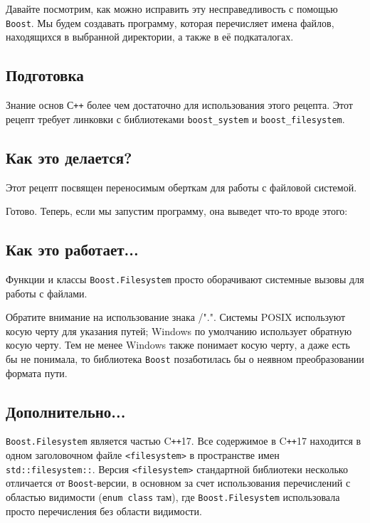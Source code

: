 \documentclass[a4paper, 12pt]{article} %
\begin{document}
Давайте посмотрим, как можно исправить эту несправедливость с помощью \texttt{Boost}. Мы будем создавать программу, которая перечисляет имена файлов, находящихся в выбранной директории, а также в её подкаталогах.

\subsection*{Подготовка}
Знание основ С\texttt{++} более чем достаточно для использования этого рецепта. Этот рецепт требует линковки с библиотеками \texttt{boost\_system} и \texttt{boost\_filesystem}.

\subsection*{Как это делается?}
Этот рецепт посвящен переносимым оберткам для работы с файловой системой.



Готово. Теперь, если мы запустим программу, она выведет что-то вроде этого:


\subsection*{Как это работает...}
Функции и классы \texttt{Boost.Filesystem} просто оборачивают системные вызовы для работы с файлами.

Обратите внимание на использование знака /".". Системы POSIX используют косую черту для указания путей; Windows по умолчанию использует обратную косую черту. Тем не менее Windows также понимает косую черту, а даже есть бы не понимала, то библиотека \texttt{Boost} позаботилась бы о неявном преобразовании формата пути.

\subsection*{Дополнительно...}
\texttt{Boost.Filesystem} является частью C\texttt{++}17. Все содержимое в C\texttt{++}17 находится в одном заголовочном файле \texttt{<filesystem>} в пространстве имен \texttt{std::filesystem::}. Версия \texttt{<filesystem>} стандартной библиотеки несколько отличается от \texttt{Boost}-версии, в основном за счет использования перечислений с областью видимости (\texttt{enum class} там), где \texttt{Boost.Filesystem} использовала просто перечисления без области видимости.

\clearpage

\nocite{*}

\printbibliography
\end{document}
